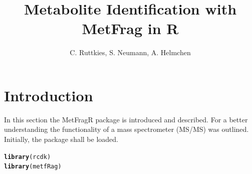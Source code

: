 \documentclass[12pt, a4paper]{scrartcl}\usepackage[]{graphicx}\usepackage[]{color}
\makeatletter
\newcommand{\hlstd}[1]{\textcolor[rgb]{0.345,0.345,0.345}{#1}}%
\newcommand{\hlkwd}[1]{\textcolor[rgb]{0.737,0.353,0.396}{\textbf{#1}}}%
\newenvironment{kframe}{%
 \def\at@end@of@kframe{}%
 \ifinner\ifhmode%
  \def\at@end@of@kframe{\end{minipage}}%
  \begin{minipage}{\columnwidth}%
 \fi\fi%
 \def\FrameCommand##1{\hskip\@totalleftmargin \hskip-\fboxsep
 \colorbox{shadecolor}{##1}\hskip-\fboxsep
     \hskip-\linewidth \hskip-\@totalleftmargin \hskip\columnwidth}%
 \MakeFramed {\advance\hsize-\width
   \@totalleftmargin\z@ \linewidth\hsize
   \@setminipage}}%
 {\par\unskip\endMakeFramed%
 \at@end@of@kframe}
\newenvironment{knitrout}{}{} %
\makeatother
\begin{document}
\title{Metabolite Identification with MetFrag in R}
\author{C. Ruttkies, S. Neumann, A. Helmchen}
\maketitle

\newpage
\tableofcontents

\newpage
\section{Introduction}
In this section the MetFragR package is introduced and described.
For a better understanding the functionality of a mass spectrometer (MS/MS) was outlined. 
Initially, the package shall be loaded.

\begin{knitrout}
\color{fgcolor}\begin{kframe}
\begin{alltt}
\hlkwd{library}\hlstd{(rcdk)}
\hlkwd{library}\hlstd{(metfRag)}
\end{alltt}
\end{kframe}
\end{knitrout}
\end{document}
